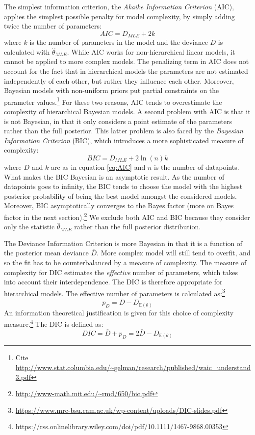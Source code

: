 \documentclass[a4paper,12pt,twoside]{article}
\begin{document}
The simplest information criterion, the \textit{Akaike Information Criterion} (AIC), applies the simplest possible penalty for model complexity, by simply adding twice the number of parameters:
%
\begin{equation}\label{eq:AIC}
AIC = D_{MLE} + 2k
\end{equation}
%
where $k$ is the number of parameters in the model and the deviance $D$ is calculated with $\hat{\theta}_{MLE}$. While AIC works for non-hierarchical linear models, it cannot be applied to more complex models. The penalizing term in AIC does not account for the fact that in hierarchical models the parameters are not estimated independently of each other, but rather they influence each other. Moreover, Bayesian models with non-uniform priors put partial constraints on the parameter values.\footnote{Cite \url{http://www.stat.columbia.edu/~gelman/research/published/waic_understand3.pdf}} For these two reasons, AIC tends to overestimate the complexity of hierarchical Bayesian models. A second problem with AIC is that it is not Bayesian, in that it only considers a point estimate of the parameters rather than the full posterior. This latter problem is also faced by the \textit{Bayesian Information Criterion} (BIC), which introduces a more sophisticated measure of complexity:
$$
BIC = D_{MLE} + 2 \ln (n) k
$$
where $D$ and $k$ are as in equation \ref{eq:AIC} and $n$ is the number of datapoints. What makes the BIC Bayesian is an asymptotic result. As the number of datapoints goes to infinity, the BIC tends to choose the model with the highest posterior probability of being the best model amongst the considered models. Moreover, BIC asymptotically converges to the Bayes factor (more on Bayes factor in the next section).\footnote{\url{http://www-math.mit.edu/~rmd/650/bic.pdf}} We exclude both AIC and BIC because they consider only the statistic $\hat{\theta}_{MLE}$ rather than the full posterior distribution.

The Deviance Information Criterion is more Bayesian in that it is a function of the posterior mean deviance $\overline{D}$. More complex model will still tend to overfit, and so the fit has to be counterbalanced by a measure of complexity. The measure of complexity for DIC estimates the \textit{effective} number of parameters, which takes into account their interdependence. The DIC is therefore appropriate for hierarchical models. The effective number of parameters is calculated as:\footnote{\url{https://www.mrc-bsu.cam.ac.uk/wp-content/uploads/DIC-slides.pdf}}
%
$$
p_D = \overline{D} - D_{\mathbb{E}(\theta)}
$$
%
An information theoretical justification is given for this choice of complexity measure.\footnote{https://rss.onlinelibrary.wiley.com/doi/pdf/10.1111/1467-9868.00353} The DIC is defined as:
%
$$
DIC = \overline{D} + p_D = 2 \overline{D} - D_{\mathbb{E}(\theta)}
$$
%
\end{document}
